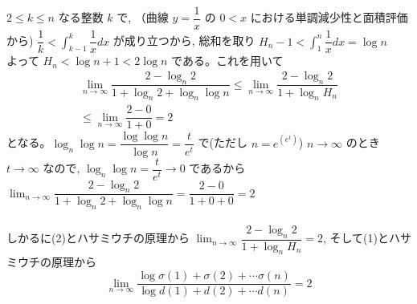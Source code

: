 \begin{enumerate}
$2\le k\le n$ なる整数 $k$ で, （曲線 $y=\dfrac{1}{x}$ の $0<x$ における単調減少性と面積評価から) $\dfrac{1}{k}<\displaystyle\int_{k-1}^{k} \dfrac{1}{x} dx$ が成り立つから, 総和を取り $H_n-1<\displaystyle\int_1^{n}\dfrac{1}{x} dx=\log{n} $ \\
よって $H_n<\log{n}+1<2\log{n}$ である。これを用いて
\begin{eqnarray*}
\displaystyle\lim_{n\to\infty}\dfrac{2-\log_n{2}}{1+\log_n{2}+\log_n{\log{n}}}\le\displaystyle\lim_{n\to\infty}\dfrac{2-\log_n{2}}{1+\log_n{H_n}}\\
\le\displaystyle\lim_{n\to\infty}\dfrac{2-0}{1+0}=2 
\end{eqnarray*}
となる。$\log_n{\log{n}}=\dfrac{\log{\log{n}}}{\log{n}}=\dfrac{t}{e^t}$ で(ただし $n= e^{(e^t)}$) $n\rightarrow \infty$ のとき $t\rightarrow \infty$ なので, $\log_n{\log{n}}=\dfrac{t}{e^t}\rightarrow 0$ であるから $\displaystyle\lim_{n\to\infty}\dfrac{2-\log_n{2}}{1+\log_n{2}+\log_n{\log{n}}}=\dfrac{2-0}{1+0+0}=2$\\
\\
しかるに(2)とハサミウチの原理から $\displaystyle\lim_{n\to\infty}\dfrac{2-\log_n{2}}{1+\log_n{H_n}}=2$, そして(1)とハサミウチの原理から
\[\displaystyle\lim_{n\to\infty }\dfrac{\log{\sigma(1) +\sigma (2)+\cdots \sigma (n)}}{\log{d(1)+d(2)+\cdots d(n)}}=2\]

\end{enumerate}